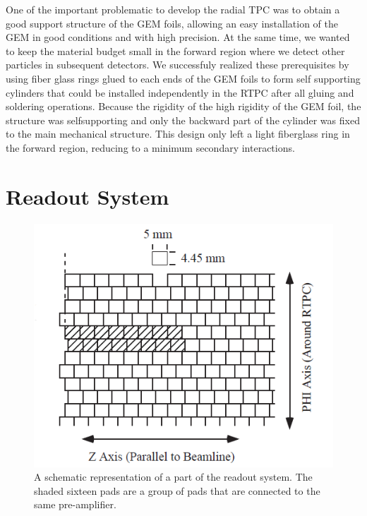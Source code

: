 \documentclass[twocolumn,showpacs,superscriptaddress,groupedaddress]{revtex4}
\begin{document}
One of the important problematic to develop the radial TPC was to obtain a 
good support structure of the GEM foils, allowing an easy installation of the 
GEM in good conditions and with high precision. At the same time, we wanted to 
keep the material budget small in the forward region where we detect other 
particles in subsequent detectors. We successfuly realized these prerequisites 
by using fiber glass rings glued to each ends of the GEM foils to form self 
supporting cylinders that could be installed independently in the RTPC after 
all gluing and soldering operations.  Because the rigidity of the high 
rigidity of the GEM foil, the structure was selfsupporting and only the 
backward part of the cylinder was fixed to the main mechanical structure. This 
design only left a light fiberglass ring in the forward region, reducing to a 
minimum secondary interactions.

\section{Readout System} \label{sec_readout}

\begin{figure}[tb]
   \centering
   \includegraphics[scale=0.55]{fig/PADs.png}
   \caption[]{A schematic representation of a part of the readout system.  The 
   shaded sixteen pads are a group of pads that are connected to the same 
pre-amplifier.} \label{fig:PADs}
\end{figure}
\end{document}
